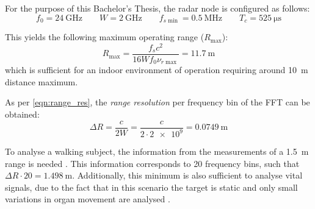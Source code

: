 For the purpose of this Bachelor's Thesis, the radar node is configured as follows:
\begin{equation} \label{eq:if_conditions}
	f_0 = \SI{24}{\giga\hertz} \qquad W = \SI{2}{\giga\hertz} \qquad f_{s\min} = \SI{0.5}{\mega\hertz} \qquad T_c = \SI{525}{\micro\second}
\end{equation}

This yields the following maximum operating range ($R_{\max}$):
\begin{equation}
	R_{\max} = \frac{f_s c^2}{16 W f_0 \nu_{r\max}} = \SI{11.7}{\meter}
\end{equation}
which is sufficient for an indoor environment of operation requiring around \SI{10}{\meter} distance maximum.

As per \cref{eqn:range_res}, the \textit{range resolution} per frequency bin of the FFT can be obtained:
\begin{equation} \label{eqn:range_res_ours}
	\Delta R = \frac{c}{2W} = \frac{c}{2 \cdot \num{2e9}} = \SI{0.0749}{\metre}
\end{equation}

To analyse a walking subject, the information from the measurements of a \SI{1.5}{\metre} range is needed \cite{Richards2010,Amin2017}. This information corresponds to 20 frequency bins, such that $\Delta R \cdot 20 = \SI{1.498}{\metre}$. Additionally, this minimum is also sufficient to analyse vital signals, due to the fact that in this scenario the target is static and only small variations in organ movement are analysed \cite{Amin2017}.



